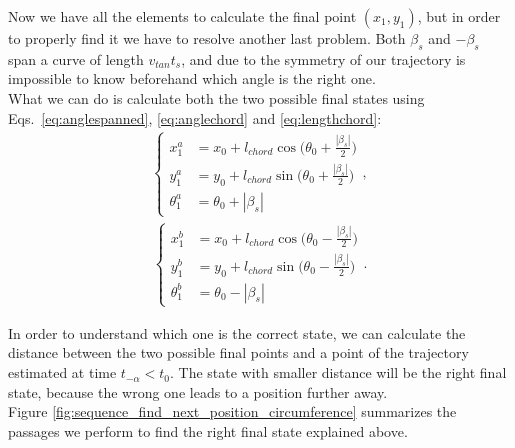 \begin{itemize}
Now we have all the elements to calculate the final point $(x_1,y_1)$, but in order to properly find it we have to resolve another last problem. Both $\beta_{s}$ and  $-\beta_{s}$ span a curve of length $v_{tan}t_s$, and due to the symmetry of our trajectory is impossible to know beforehand which angle is the right one. \\
What we can do is calculate both the two possible final states using Eqs.~\eqref{eq:anglespanned}, \eqref{eq:anglechord} and \eqref{eq:lengthchord}:
\begin{align}
\begin{cases}
x_1^a &= x_0 + l_{chord}\cos{\Big(\theta_0 + \frac{|\beta_s|}{2}\Big) }\\[5pt]
y_1^a &= y_0 + l_{chord}\sin{\Big(\theta_0 + \frac{|\beta_s|}{2} \Big)}\\[5pt]
\theta_1^a &=  \theta_0 + |\beta_s|
\end{cases},
\end{align}
\begin{align}
\begin{cases}
x_1^b &= x_0 + l_{chord}\cos{\Big(\theta_0 - \frac{|\beta_s|}{2}\Big) }\\[5pt]
y_1^b &= y_0 + l_{chord}\sin{\Big(\theta_0 - \frac{|\beta_s|}{2}\Big) }\\[5pt]
\theta_1^b &=  \theta_0 - |\beta_s|
\end{cases}.
\end{align}

In order to understand which one is the correct state, we can calculate the distance between the two possible final points and a point of the trajectory estimated at time $ t_{-\alpha} < t_0$. The state with smaller distance will be the right final state, because the wrong one leads to a position further away.\\

Figure \ref{fig:sequence_find_next_position_circumference} summarizes the passages we perform to find the right final state explained above.


\end{itemize}
